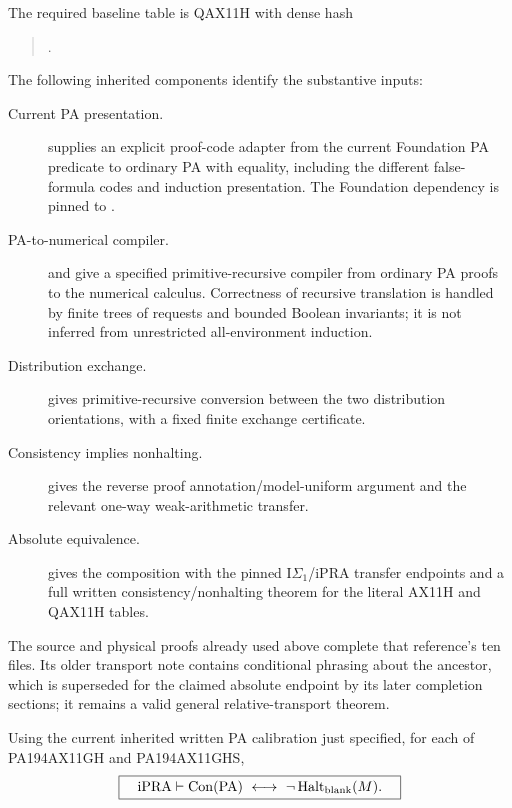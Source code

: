 The required baseline table is QAX11H with dense hash
\begin{quote}\small
{}.
\end{quote}
The following inherited components identify the substantive inputs:
\begin{description}
\item[Current PA presentation.]
 supplies an explicit proof-code adapter from the current Foundation PA
predicate to ordinary PA with equality, including the different
false-formula codes and induction presentation. The Foundation
dependency is pinned to
.
\item[PA-to-numerical compiler.]
 and
 give a specified primitive-recursive compiler from ordinary PA proofs
to the numerical calculus. Correctness of recursive translation is
handled by finite trees of requests and bounded Boolean invariants;
it is not inferred from unrestricted all-environment induction.
\item[Distribution exchange.]
 gives primitive-recursive conversion between the two distribution
orientations, with a fixed finite exchange certificate.
\item[Consistency implies nonhalting.]
 gives the reverse proof annotation/model-uniform argument and the
relevant one-way weak-arithmetic transfer.
\item[Absolute equivalence.]
 gives the composition with the pinned I$\Sigma_1$/iPRA transfer endpoints
and a full written consistency/nonhalting theorem for the literal
AX11H and QAX11H tables.
\end{description}
The source and physical proofs already used above complete that
reference's ten files. Its older transport note contains conditional
phrasing about the ancestor, which is superseded for the claimed
absolute endpoint by its later completion sections; it remains a
valid general relative-transport theorem.

\begin{theorem}
Using the current inherited written PA calibration just specified,
for each of PA194AX11GH and PA194AX11GHS,
\[
 \boxed{\quad
 \mathrm{iPRA}\vdash
 \operatorname{Con}(\mathrm{PA})\ \longleftrightarrow\
           \neg\operatorname{Halt}_{\rm blank}(M).
 \quad}
\]
\end{theorem}

